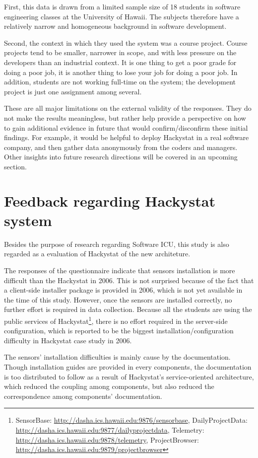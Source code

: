 First, this data is drawn from a limited sample size of 18 students in software engineering classes at the University of Hawaii. The subjects therefore have a relatively narrow and homogeneous background in software development.

Second, the context in which they used the system was a course project.  Course projects tend to be smaller, narrower in scope, and with less pressure on the developers than an industrial context.  It is one thing to get a poor grade for doing a poor job, it is another thing to lose your job for doing a poor job.  In addition, students are not working full-time on the system; the development project is just one assignment among several.  

These are all major limitations on the external validity of the responses.  They do not make the results meaningless, but rather help provide a perspective on how to gain additional evidence in future that would confirm/disconfirm these initial findings.  For example, it would be helpful to deploy Hackystat in a real software company, and then gather data anonymously from the coders and managers. Other insights into future research directions will be covered in an upcoming section.

\section {Feedback regarding Hackystat system}
Besides the purpose of research regarding Software ICU, this study is also regarded as a evaluation of Hackystat of the new architeture.

The responses of the questionnaire indicate that sensors installation is more difficult than the Hackystat in 2006. This is not surprised because of the fact that a client-side installer package is provided in 2006, which is not yet available in the time of this study. However, once the sensors are installed correctly, no further effort is required in data collection. Because all the students are using the public services of Hackystat\footnote{SensorBase: \url{http://dasha.ics.hawaii.edu:9876/sensorbase}, DailyProjectData: \url{http://dasha.ics.hawaii.edu:9877/dailyprojectdata}, Telemetry: \url{http://dasha.ics.hawaii.edu:9878/telemetry}, ProjectBrowser: \url{http://dasha.ics.hawaii.edu:9879/projectbrowser}}, there is no effort required in the server-side configuration, which is reported to be the biggest installation/configuration difficulty in Hackystat case study in 2006.

The sensors' installation difficulties is mainly cause by the documentation. Though installation guides are provided in every components, the documentation is too distributed to follow as a result of Hackystat's service-oriented architecture, which reduced the coupling among components, but also reduced the correspondence among components' documentation.

